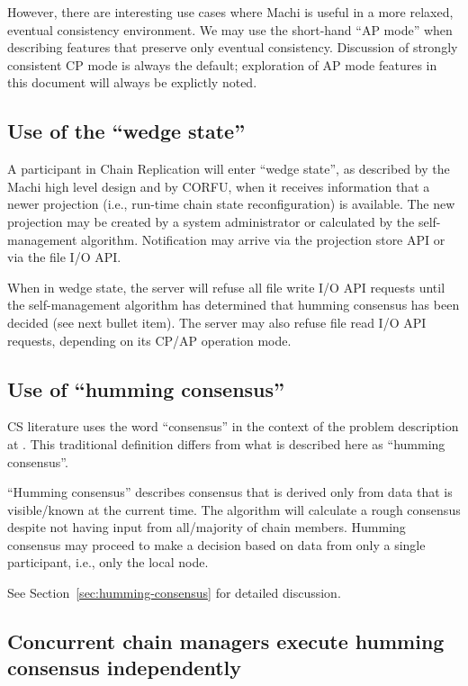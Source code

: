 \documentclass[preprint,10pt]{sigplanconf}
\begin{document}
However, there are interesting use cases where Machi is useful in a
more relaxed, eventual consistency environment.  We may use the
short-hand ``AP mode'' when describing features that preserve only
eventual consistency.  Discussion of strongly consistent CP
mode is always the default; exploration of AP mode features in this document
will always be explictly noted.

\subsection{Use of the ``wedge state''}

A participant in Chain Replication will enter ``wedge state'', as
described by the Machi high level design \cite{machi-design} and by CORFU,
when it receives information that
a newer projection (i.e., run-time chain state reconfiguration) is
available.  The new projection may be created by a system
administrator or calculated by the self-management algorithm.
Notification may arrive via the projection store API or via the file
I/O API.

When in wedge state, the server will refuse all file write I/O API
requests until the self-management algorithm has determined that
humming consensus has been decided (see next bullet item).  The server
may also refuse file read I/O API requests, depending on its CP/AP
operation mode.

\subsection{Use of ``humming consensus''}

CS literature uses the word ``consensus'' in the context of the problem
description at \cite{wikipedia-consensus}
.
This traditional definition differs from what is described here as
``humming consensus''.

``Humming consensus'' describes
consensus that is derived only from data that is visible/known at the current
time.
The algorithm will calculate
a rough consensus despite not having input from all/majority
of chain members.  Humming consensus may proceed to make a
decision based on data from only a single participant, i.e., only the local
node.

See Section~\ref{sec:humming-consensus} for detailed discussion.

\subsection{Concurrent chain managers execute humming consensus independently}
\end{document}
